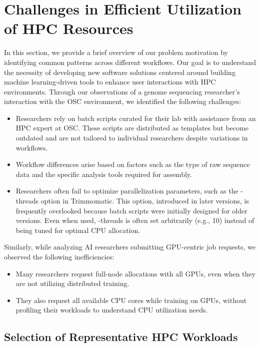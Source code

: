 \chapter{Challenges in Efficient Utilization of HPC Resources}
\label{problem.ch}

In this section, we provide a brief overview of our problem motivation by identifying common patterns across different workflows. Our goal is to understand the necessity of developing new software solutions centered around building machine learning-driven tools to enhance user interactions with HPC environments.
Through our observations of a genome sequencing researcher’s interaction with the OSC environment, we identified the following challenges:
\begin{itemize}
    \item Researchers rely on batch scripts curated for their lab with assistance from an HPC expert at OSC. These scripts are distributed as templates but become outdated and are not tailored to individual researchers despite variations in workflows.
    \item Workflow differences arise based on factors such as the type of raw sequence data and the specific analysis tools required for assembly.
    \item Researchers often fail to optimize parallelization parameters, such as the -threads option in Trimmomatic. This option, introduced in later versions, is frequently overlooked because batch scripts were initially designed for older versions. Even when used, -threads is often set arbitrarily (e.g., 10) instead of being tuned for optimal CPU allocation.
\end{itemize}

Similarly, while analyzing AI researchers submitting GPU-centric job requests, we observed the following inefficiencies:

\begin{itemize}
    \item Many researchers request full-node allocations with all GPUs, even when they are not utilizing distributed training.
    \item They also request all available CPU cores while training on GPUs, without profiling their workloads to understand CPU utilization needs.
\end{itemize}

\section{Selection of Representative HPC Workloads}

